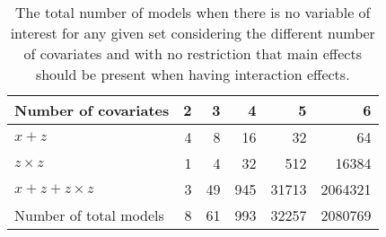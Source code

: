 \begin{table}[!h]
\centering
\caption{The total number of models when there is no variable of interest for any given set considering the different number of covariates and with no restriction that main effects should be present when having interaction effects.} 
\begin{tabular}{lrrrrr}
  \hline
Number of covariates & 2 & 3 & 4 & 5 & 6 \\ 
  \hline
  $x + z$ & 4 & 8 & 16 & 32 & 64 \\ 
  $z \times z$ & 1 & 4 & 32 & 512 & 16384 \\ 
  $x + z + z \times z$ & 3 & 49 & 945 & 31713 & 2064321 \\ 
  \hline
  Number of total models & 8 & 61 & 993 & 32257 & 2080769 \\ 
   \hline
\end{tabular}
\end{table}
